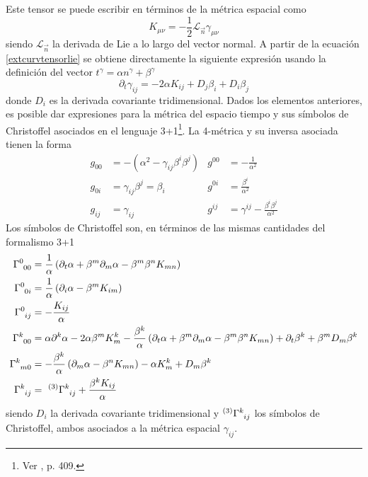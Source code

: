 \documentclass[11pt,twoside,openright,spanish]{report}
\numberwithin{equation}{chapter}
\numberwithin{figure}{chapter}
\numberwithin{table}{chapter}
\begin{document}
Este tensor se puede escribir en términos de la métrica espacial como
\begin{equation}
K_{\mu\nu}=-\frac{1}{2}\mathcal{L}_{\vec{n}}\gamma_{\mu\nu}
\label{extcurvtensorlie}
\end{equation}
siendo $\mathcal{L}_{\vec{n}}$ la derivada de Lie a lo largo del vector normal. A partir de la ecuación \eqref{extcurvtensorlie} se obtiene directamente la siguiente expresión usando la definición del vector $t^\gamma=\alpha n^\gamma+\beta^\gamma$
\begin{equation}
\partial_t \gamma_{ij}=-2\alpha K_{ij}+D_j\beta_i+D_i\beta_j
\label{cambioengamma}
\end{equation}
donde $D_i$ es la derivada covariante tridimensional. Dados los elementos anteriores, es posible dar expresiones para la métrica del espacio tiempo y sus símbolos de Christoffel asociados en el lenguaje 3+1\footnote{Ver \citet{alcubierre}, p. 409.}. La 4-métrica y su inversa asociada tienen la forma
\begin{subequations}
	\begin{align}
	g_{00}&=-\left(\alpha^2-\gamma_{ij}\beta^i\beta^j\right) & g^{00}&=-\frac{1}{\alpha^2}\\
	g_{0i}&=\gamma_{ij}\beta^j=\beta_i                       & g^{0i}&=\frac{\beta^i}{\alpha^2}\\
	g_{ij}&=\gamma_{ij}                                      & g^{ij}&=\gamma^{ij}-\frac{\beta^i\beta^j}{\alpha^2}
	\end{align}\label{g}
\end{subequations}
Los símbolos de Christoffel son, en términos de las mismas cantidades del formalismo 3+1
\begin{subequations}
	\begin{align}
	\tensor{\Gamma}{^0_0_0}&=\frac{1}{\alpha}\left(\partial_t\alpha+\beta^m\partial_m\alpha-\beta^m\beta^n K_{mn}\right)\label{geodgen}\\
	\tensor{\Gamma}{^0_0_i}&=\frac{1}{\alpha}\left(\partial_i\alpha-\beta^m K_{im}\right)\\
	\tensor{\Gamma}{^0_i_j}&=-\frac{K_{ij}}{\alpha}\\
	\tensor{\Gamma}{^k_0_0}&=\alpha\partial^k \alpha-2\alpha\beta^m K_m^k -\frac{\beta^k}{\alpha}\left(\partial_t\alpha+\beta^m\partial_m\alpha-\beta^m\beta^nK_{mn}\right)+\partial_t\beta^k+\beta^mD_m\beta^k\\
	\tensor{\Gamma}{^k_m_0}&=-\frac{\beta^k}{\alpha}\left(\partial_m\alpha-\beta^nK_{mn}\right)-\alpha K_m^k+D_m\beta^k\\
	\tensor{\Gamma}{^k_i_j}&=\ ^{(3)}{\tensor{\Gamma}{^k_i_j}}+\frac{\beta^kK_{ij}}{\alpha}
	\end{align}\label{christoffel3+1}
\end{subequations}
siendo $D_i$ la derivada covariante tridimensional y $^{(3)}\tensor{\Gamma}{^k_i_j}$ los símbolos de Christoffel, ambos asociados a la métrica espacial $\gamma_{ij}$.
\end{document}

